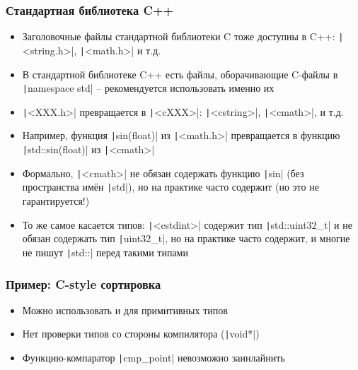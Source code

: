 \documentclass[10pt]{beamer}
\begin{document}
\begin{frame}[fragile]
\frametitle{Стандартная библиотека C++}
\begin{itemize}
\item Заголовочные файлы стандартной библиотеки C тоже доступны в C++: \texttt|<string.h>|, \texttt|<math.h>| и т.д.
\pause
\item В стандартной библиотеке C++ есть файлы, оборачивающие C-файлы в \texttt|namespace std| -- рекомендуется использовать именно их
\pause
\item \texttt|<XXX.h>| превращается в \texttt|<cXXX>|: \texttt|<cstring>|, \texttt|<cmath>|, и т.д.
\pause
\item Например, функция \texttt|sin(float)| из \texttt|<math.h>| превращается в функцию \texttt|std::sin(float)| из \texttt|<cmath>|
\pause
\item Формально, \texttt|<cmath>| не обязан содержать функцию \texttt|sin| (без пространства имён \texttt|std|), но на практике часто содержит (но это не гарантируется!)
\pause
\item То же самое касается типов: \texttt|<cstdint>| содержит тип \texttt|std::uint32_t| и не обязан содержать тип \texttt|uint32_t|, но на практике часто содержит, и многие не пишут \texttt|std::| перед такими типами
\end{itemize}
\end{frame}

\begin{frame}[fragile]
\frametitle{Пример: C-style сортировка}
\begin{itemize}
\begin{tcblisting}{listing engine=minted, minted language=cpp, minted options={fontsize=\scriptsize}, listing only, colback=codebg, colframe=codebg, rounded corners}
struct point {
  int x, y;
};

void qsort(void* array, size_t count, size_t size,
  int (*comp)(const void*, const void*));

int cmp_point(const void* v1, const void* v2) {
  const struct point *p1 = (const struct point*)v1;
  const struct point *p2 = (const struct point*)v2;
  ...
}

struct point points[10];
qsort(points, 10, sizeof(points[0]), cmp_point);
\end{tcblisting}
\pause
{}
\item Можно использовать и для примитивных типов
\pause
\item Нет проверки типов со стороны компилятора (\texttt|void*|)
\pause
\item Функцию-компаратор \texttt|cmp_point| невозможно заинлайнить
\end{itemize}
\end{frame}
\end{document}
